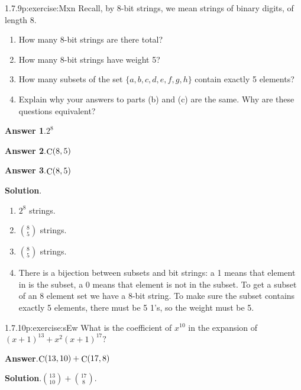 \documentclass[twoside,11pt,]{book}
\newcommand{\blocktitlefont}{\relax}
\numberwithin{equation}{chapter}
\begin{document}
\begin{divisionsolution}{1.7.9}{}{p:exercise:Mxn}%
Recall, by \(8\)-bit strings, we mean strings of binary digits, of length 8.%
\begin{enumerate}[label=(\alph*)]
\item{}How many \(8\)-bit strings are there total?%
\item{}How many \(8\)-bit strings have weight 5?%
\item{}How many subsets of the set \(\{a,b,c,d,e,f,g,h\}\) contain exactly 5 elements?%
\item{}Explain why your answers to parts (b) and (c) are the same. Why are these questions equivalent?%
\end{enumerate}
%
\par\smallskip%
\noindent\textbf{\blocktitlefont Answer 1}.\quad{}\(2^{8}\)%
\par\smallskip%
\noindent\textbf{\blocktitlefont Answer 2}.\quad{}\(\mathop{\rm C}\nolimits\!\left(8,5\right)\)%
\par\smallskip%
\noindent\textbf{\blocktitlefont Answer 3}.\quad{}\(\mathop{\rm C}\nolimits\!\left(8,5\right)\)%
\par\smallskip%
\noindent\textbf{\blocktitlefont Solution}.\quad{}%
\begin{enumerate}[label=(\alph*)]
\item{}\(2^8\) strings.%
\item{}\({8 \choose 5}\) strings.%
\item{}\({8 \choose 5}\) strings.%
\item{}There is a bijection between subsets and bit strings: a 1 means that element in is the subset, a 0 means that element is not in the subset. To get a subset of an 8 element set we have a 8-bit string. To make sure the subset contains exactly 5 elements, there must be 5 1's, so the weight must be 5.%
\end{enumerate}
%
\end{divisionsolution}%
\begin{divisionsolution}{1.7.10}{}{p:exercise:sEw}%
What is the coefficient of \(x^{10}\) in the expansion of \((x+1)^{13} + x^2(x+1)^{17}\text{?}\)%
\par\smallskip%
\noindent\textbf{\blocktitlefont Answer}.\quad{}\(\mathop{\rm C}\nolimits\!\left(13,10\right)+\mathop{\rm C}\nolimits\!\left(17,8\right)\)%
\par\smallskip%
\noindent\textbf{\blocktitlefont Solution}.\quad{}\({13 \choose 10} + {17 \choose 8}\text{.}\)%
\end{divisionsolution}%
\end{document}
